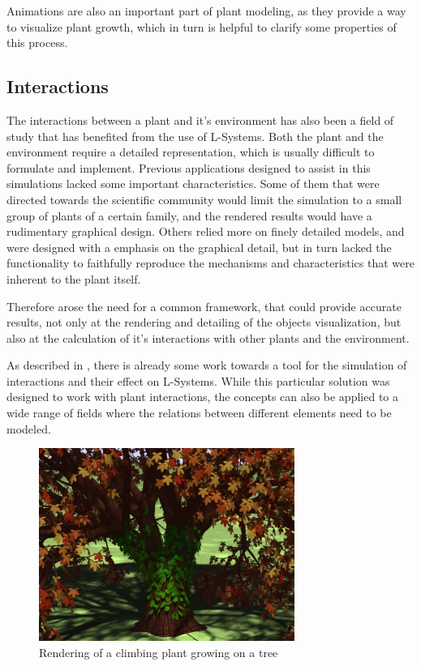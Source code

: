 \documentclass{acmtog}
\begin{document}
Animations are also an important part of plant modeling, as they provide a way to visualize plant growth, which in turn is helpful to clarify some properties of this process.

\subsection{Interactions}
\label{subsec:interactions}

The interactions between a plant and it's environment has also been a field of study that has benefited from the use of L-Systems. Both the plant and the environment require a detailed representation, which is usually difficult to formulate and implement. Previous applications designed to assist in this simulations lacked some important characteristics. Some of them that were directed towards the scientific community would limit the simulation to a small group of plants of a certain family, and the rendered results would have a rudimentary graphical design. Others relied more on finely detailed models, and were designed with a emphasis on the graphical detail, but in turn lacked the functionality to faithfully reproduce the mechanisms and characteristics that were inherent to the plant itself.

Therefore arose the need for a common framework, that could provide accurate results, not only at the rendering and detailing of the objects visualization, but also at the calculation of it's interactions with other plants and the environment.

As described in \cite{mech1996visual}, there is already some work towards a tool for the simulation of interactions and their effect on L-Systems. While this particular solution was designed to work with plant interactions, the concepts can also be applied to a wide range of fields where the relations between different elements need to be modeled.

\begin{figure}[!htp]
  \begin{center}
    \includegraphics[width=0.8\columnwidth]{images/7_plants}
    \caption{Rendering of a climbing plant growing on a tree \label{fig:relations}}
    \end{center}
\end{figure}
\end{document}
